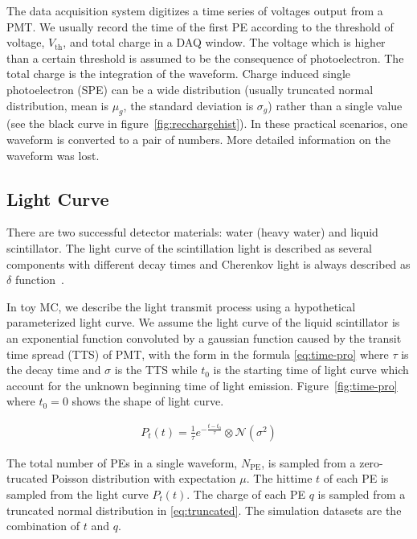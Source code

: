The data acquisition system digitizes a time series of voltages output from a PMT. We usually record the time of the first PE according to the threshold of voltage, $V_\mathrm{th}$, and total charge in a DAQ window. The voltage which is higher than a certain threshold is assumed to be the consequence of photoelectron. The total charge is the integration of the waveform. Charge induced single photoelectron (SPE) can be a wide distribution (usually truncated normal distribution, mean is $\mu_{g}$, the standard deviation is $\sigma_{g}$) rather than a single value (see the black curve in figure~\ref{fig:recchargehist}). In these practical scenarios, one waveform is converted to a pair of numbers. More detailed information on the waveform was lost. 

\subsection{Light Curve}

There are two successful detector materials: water (heavy water) and liquid scintillator. The light curve of the scintillation light is described as several components with different decay times and Cherenkov light is always described as $\delta$ function~\cite{ludhova_particle_2020}. 

In toy MC, we describe the light transmit process using a hypothetical parameterized light curve. We assume the light curve of the liquid scintillator is an exponential function convoluted by a gaussian function \cite{li_separation_2016} caused by the transit time spread (TTS) of PMT, with the form in the formula \eqref{eq:time-pro} where $\tau$ is the decay time and $\sigma$ is the TTS while $t_{0}$ is the starting time of light curve which account for the unknown beginning time of light emission. Figure~\ref{fig:time-pro} where $t_{0}=0$ shows the shape of light curve. 

\begin{align}
    P_{t}(t) = \frac{1}{\tau}e^{-\frac{t - t_{0}}{\tau}} \otimes \mathcal{N}(\sigma^{2})
    \label{eq:time-pro}
\end{align}

The total number of PEs in a single waveform, $N_\mathrm{PE}$, is sampled from a zero-trucated Poisson distribution with expectation $\mu$. The hittime $t$ of each PE is sampled from the light curve $P_{t}(t)$. The charge of each PE $q$ is sampled from a truncated normal distribution in \eqref{eq:truncated}. The simulation datasets are the combination of $t$ and $q$.

